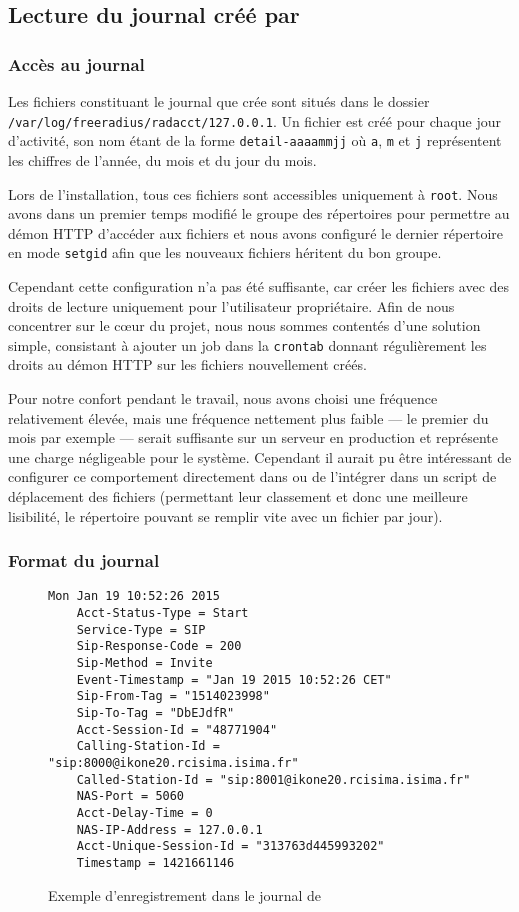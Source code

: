 \subsection{Lecture du journal créé par \frad}

\subsubsection{Accès au journal}

Les fichiers constituant le journal que crée {\frad} sont situés dans le dossier \texttt{/var/log/freeradius/radacct/127.0.0.1}. Un fichier est créé pour chaque jour d’activité, son nom étant de la forme \texttt{detail-aaaammjj} où \texttt{a}, \texttt{m} et \texttt{j} représentent les chiffres de l’année, du mois et du jour du mois.

Lors de l’installation, tous ces fichiers sont accessibles uniquement à \texttt{root}. Nous avons dans un premier temps modifié le groupe des répertoires pour permettre au démon HTTP d’accéder aux fichiers et nous avons configuré le dernier répertoire en mode \texttt{setgid} afin que les nouveaux fichiers héritent du bon groupe.

Cependant cette configuration n’a pas été suffisante, car {\frad} créer les fichiers avec des droits de lecture uniquement pour l’utilisateur propriétaire. Afin de nous concentrer sur le cœur du projet, nous nous sommes contentés d’une solution simple, consistant à ajouter un job dans la \texttt{crontab} donnant régulièrement les droits au démon HTTP sur les fichiers nouvellement créés.

Pour notre confort pendant le travail, nous avons choisi une fréquence relativement élevée, mais une fréquence nettement plus faible — le premier du mois par exemple — serait suffisante sur un serveur en production et représente une charge négligeable pour le système. Cependant il aurait pu être intéressant de configurer ce comportement directement dans {\frad} ou de l’intégrer dans un script de déplacement des fichiers (permettant leur classement et donc une meilleure lisibilité, le répertoire pouvant se remplir vite avec un fichier par jour).

\subsubsection{Format du journal}

\begin{figure}[h!]
\begin{verbatim}
Mon Jan 19 10:52:26 2015
	Acct-Status-Type = Start
	Service-Type = SIP
	Sip-Response-Code = 200
	Sip-Method = Invite
	Event-Timestamp = "Jan 19 2015 10:52:26 CET"
	Sip-From-Tag = "1514023998"
	Sip-To-Tag = "DbEJdfR"
	Acct-Session-Id = "48771904"
	Calling-Station-Id = "sip:8000@ikone20.rcisima.isima.fr"
	Called-Station-Id = "sip:8001@ikone20.rcisima.isima.fr"
	NAS-Port = 5060
	Acct-Delay-Time = 0
	NAS-IP-Address = 127.0.0.1
	Acct-Unique-Session-Id = "313763d445993202"
	Timestamp = 1421661146
\end{verbatim}
\caption{Exemple d’enregistrement dans le journal de \frad}
\label{radrecord}
\end{figure}

